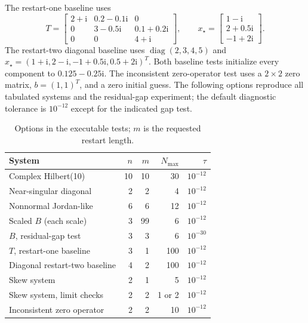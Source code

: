 The restart-one baseline uses
\begin{equation}
    T=\begin{bmatrix}
        2+\mathrm{i}&0.2-0.1\mathrm{i}&0\\
        0&3-0.5\mathrm{i}&0.1+0.2\mathrm{i}\\
        0&0&4+\mathrm{i}
    \end{bmatrix},\qquad
    x_\star=\begin{bmatrix}1-\mathrm{i}\\2+0.5\mathrm{i}\\-1+2\mathrm{i}\end{bmatrix}.
\end{equation}
The restart-two diagonal baseline uses $\operatorname{diag}(2,3,4,5)$ and
$x_\star=(1+\mathrm{i},2-\mathrm{i},-1+0.5\mathrm{i},0.5+2\mathrm{i})^T$.
Both baseline tests initialize every component to $0.125-0.25\mathrm{i}$.
The inconsistent zero-operator test uses a $2\times2$ zero matrix,
$b=(1,1)^T$, and a zero initial guess. The following options reproduce all
tabulated systems and the residual-gap experiment; the default diagnostic
tolerance is $10^{-12}$ except for the indicated gap test.

\begin{table}[H]
\centering
\small
\caption{Options in the executable tests; $m$ is the requested restart length.}
\label{tab:options}
\begin{tabular}{lrrrr}
\toprule
System & $n$ & $m$ & $N_{\max}$ & $\tau$ \\
\midrule
Complex Hilbert(10) & 10 & 10 & 30 & $10^{-12}$ \\
Near-singular diagonal & 2 & 2 & 4 & $10^{-12}$ \\
Nonnormal Jordan-like & 6 & 6 & 12 & $10^{-12}$ \\
Scaled $B$ (each scale) & 3 & 99 & 6 & $10^{-12}$ \\
$B$, residual-gap test & 3 & 3 & 6 & $10^{-30}$ \\
$T$, restart-one baseline & 3 & 1 & 100 & $10^{-12}$ \\
Diagonal restart-two baseline & 4 & 2 & 100 & $10^{-12}$ \\
Skew system & 2 & 1 & 5 & $10^{-12}$ \\
Skew system, limit checks & 2 & 2 & 1 or 2 & $10^{-12}$ \\
Inconsistent zero operator & 2 & 2 & 10 & $10^{-12}$ \\
\bottomrule
\end{tabular}
\end{table}

